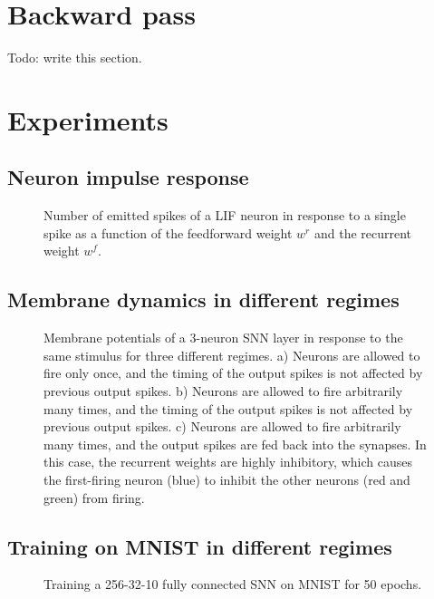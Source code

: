 \documentclass[12pt]{article}
\begin{document}
\section{Backward pass}
Todo: write this section.
\newpage

\section{Experiments}

\subsection{Neuron impulse response}
\begin{figure}[H]
  \centering
  \graphicspath{{../visualizations/single-neuron-impulse-response/report}}
  
  \caption{Number of emitted spikes of a LIF neuron in response to a single spike as a function of the feedforward weight $w^r$ and the recurrent weight $w^f$.}
  \label{impulse-response-figure}
\end{figure}

\subsection{Membrane dynamics in different regimes}
\begin{figure}[H]
  \centering
  
  \caption{Membrane potentials of a 3-neuron SNN layer in response to the same stimulus for three different regimes. a) Neurons are allowed to fire only once, and the timing of the output spikes is not affected by previous output spikes. b) Neurons are allowed to fire arbitrarily many times, and the timing of the output spikes is not affected by previous output spikes. %
    c) Neurons are allowed to fire arbitrarily many times, and the output spikes are fed back into the synapses. In this case, the recurrent weights are highly inhibitory, which causes the first-firing neuron (blue) to inhibit the other neurons (red and green) from firing.}
  \label{regime-comparison-figure}
\end{figure}

\subsection{Training on MNIST in different regimes}
\begin{figure}[H]
  \centering
  
  \caption{Training a 256-32-10 fully connected SNN on MNIST for 50 epochs.}
  \label{training-comparison-figure}
\end{figure}
\end{document}

